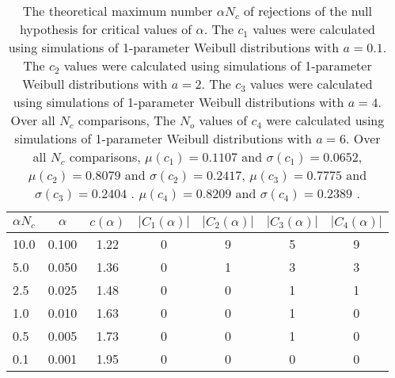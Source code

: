 \begin{table}[h!]
\begin{center}
\begin{tabular}{| l | c | c | c | c | c | c |}\hline
$\alpha N_c$ & $\alpha$ & $c(\alpha)$ & $|C_1(\alpha)|$ & $|C_2(\alpha)|$ & $|C_3(\alpha)|$ & $|C_4(\alpha)|$ \\\hline\hline
10.0 & 0.100 & 1.22 & 0 & 9 & 5 & 9 \\\hline
5.0 & 0.050 & 1.36 & 0 & 1 & 3 & 3 \\\hline
2.5 & 0.025 & 1.48 & 0 & 0 & 1 & 1 \\\hline
1.0 & 0.010 & 1.63 & 0 & 0 & 1 & 0 \\\hline
0.5 & 0.005 & 1.73 & 0 & 0 & 1 & 0 \\\hline
0.1 & 0.001 & 1.95 & 0 & 0 & 0 & 0 \\\hline
\end{tabular}
\caption{The theoretical maximum number $\alpha N_c$ of rejections
        of the null hypothesis for critical values of $\alpha$.
        The $c_1$ values were calculated using simulations of 1-parameter Weibull distributions with $a=0.1$.
        The $c_2$ values were calculated using simulations of 1-parameter Weibull distributions with $a=2$.
        The $c_3$ values were calculated using simulations of 1-parameter Weibull distributions with $a=4$.
        Over all $N_c$ comparisons,
        The $N_o$ values of $c_4$ were calculated using simulations of
         1-parameter Weibull distributions with $a=6$.
        Over all $N_c$ comparisons,
         $\mu(c_1)=0.1107$ and $\sigma(c_1)=0.0652$,
         $\mu(c_2)=0.8079$ and $\sigma(c_2)=0.2417$,
         $\mu(c_3)=0.7775$ and $\sigma(c_3)=0.2404$ .
         $\mu(c_4)=0.8209$ and $\sigma(c_4)=0.2389$ .
        }
\end{center}
\end{table}